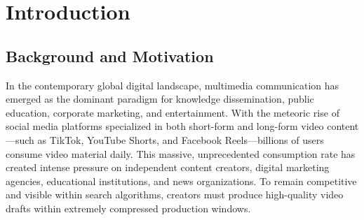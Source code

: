 \documentclass[a4paper,12pt]{report}
\begin{document}
\tableofcontents
\newpage
\listoffigures
\newpage
\listoftables
\newpage

\chapter{Introduction}
\label{ch:intro}
\section{Background and Motivation}
In the contemporary global digital landscape, multimedia communication has emerged as the dominant paradigm for knowledge dissemination, public education, corporate marketing, and entertainment. With the meteoric rise of social media platforms specialized in both short-form and long-form video content—such as TikTok, YouTube Shorts, and Facebook Reels—billions of users consume video material daily. This massive, unprecedented consumption rate has created intense pressure on independent content creators, digital marketing agencies, educational institutions, and news organizations. To remain competitive and visible within search algorithms, creators must produce high-quality video drafts within extremely compressed production windows.
\end{document}
